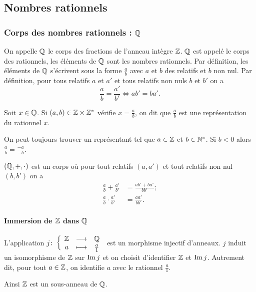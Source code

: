 \subsection{Nombres rationnels}

\subsubsection{Corps des nombres rationnels : $\mathbb{Q}$}

\begin{defdef}
  On appelle $\mathbb{Q}$ le corps des fractions de l'anneau intègre $\mathbb{Z}$. $\mathbb{Q}$ est appelé le corps des rationnels, les éléments de $\mathbb{Q}$ sont les nombres rationnels. Par définition, les éléments de $\mathbb{Q}$ s'écrivent sous la forme $\frac{a}{b}$ avec $a$ et $b$ des relatifs et $b$ non nul. Par définition, pour tous relatifs $a$ et $a'$ et tous relatifs non nuls $b$ et $b'$ on a
  \begin{equation}
    \frac{a}{b} = \frac{a'}{b'} \iff ab'=ba'.
  \end{equation}
\end{defdef}
\begin{defdef}
  Soit $x \in \mathbb{Q}$. Si $(a,b) \in \mathbb{Z} \times \mathbb{Z}^*$ vérifie $x=\frac{a}{b}$, on dit que $\frac{a}{b}$ est une représentation du rationnel $x$.
\end{defdef}

On peut toujours trouver un représentant tel que $a \in \mathbb{Z}$ et $b \in \mathbb{N}^*$. Si $b <0$ alors $\frac{a}{b}=\frac{-a}{-b}$.

$(\mathbb{Q}, +, \cdot)$ est un corps où pour tout relatifs $(a,a')$ et tout relatifs non nul $(b,b')$ on a
\begin{align}
  \frac{a}{b}+\frac{a'}{b'} &= \frac{ab'+ba'}{bb'}; \\
  \frac{a}{b} \cdot \frac{a'}{b'} &= \frac{aa'}{bb'}.
\end{align}

\paragraph{Immersion de $\mathbb{Z}$ dans $\mathbb{Q}$}

L'application $j\colon \left\{\begin{array}{ccc} \mathbb{Z} & \longrightarrow &\mathbb{Q}\\ a & \longmapsto & \frac{a}{1} \end{array} \right.$ est un morphisme injectif d'anneaux. $j$ induit un isomorphisme de $\mathbb{Z}$ sur $\operatorname{Im}{j}$ et on choisit d'identifier $\mathbb{Z}$ et $\operatorname{Im}{j}$. Autrement dit, pour tout $a \in \mathbb{Z}$, on identifie $a$ avec le rationnel $\frac{a}{1}$.

Ainsi $\mathbb{Z}$ est un sous-anneau de $\mathbb{Q}$.

